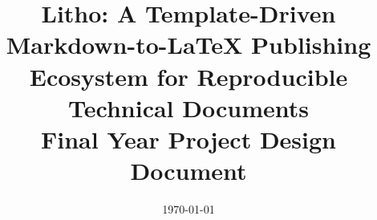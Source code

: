\documentclass[a4paper,12pt,oneside]{uet_thesis}
\newcommand{\placeholder}[1]{\textcolor{PlaceholderBlue}{\textit{<#1>}}}
\begin{document}
\title{\texorpdfstring{Litho: A Template-Driven Markdown-to-LaTeX Publishing Ecosystem for Reproducible Technical Documents\\{\large Final Year Project Design Document}}{Litho: A Template-Driven Markdown-to-LaTeX Publishing Ecosystem for Reproducible Technical Documents - Final Year Project Design Document}}
\addresses{\deptname \\ \univname}
\date{\today}
\subject{Final Year Project Design Document}
\maketitle

\fancyhead{}
\rhead{\thepage}
\lhead{}
\pagestyle{fancy}


\end{document}
